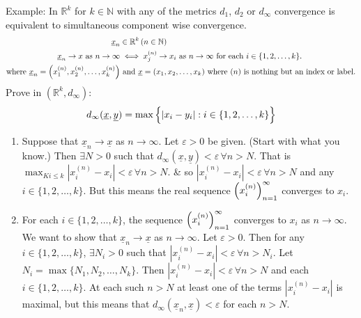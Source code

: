 \documentclass[10pt]{article}
\begin{document}
Example: In $\mathbb{R}^{k}$ for $k\in\mathbb{N}$ with any of the metrics $d_{1}$, $d_{2}$ or $d_{\infty}$ convergence is equivalent to simultaneous component wise convergence.
\begin{align*}
    \underline{x}_{n}&\in\mathbb{R}^{k}\,(n\in\mathbb{N})\\
    \underline{x}_{n}\to x\text{ as }n\to\infty&\iff x_{j}^{(n)}\to x_{i}\text{ as }n\to\infty\text{ for each }i\in\{1,2,\dots,k\}.\\
    \text{where }\underline{x}_{n}=\Big{(}x_{1}^{(n)}, x_{2}^{(n)}, \dots, x_{k}^{(n)}\Big{)}&\text{ and }\underline{x}=(x_{1}, x_{2}, \dots, x_{k})\text{ where }(n)\text{ is nothing but an index or label.}
\end{align*}
Prove in $(\mathbb{R}^{k}, d_{\infty})$:
\begin{align*}
    d_{\infty}(\underline{x}, \underline{y})=\max\Big{\{}|x_{i}-y_{i}|:i\in\{1, 2, \dots, k\}\Big{\}}
\end{align*}
\begin{enumerate}[label=\roman*)]
    \item Suppose that $\underline{x}_{n}\to\underline{x}$ as $n\to\infty$. Let $\varepsilon>0$ be given. (Start with what you know.) Then $\exists N>0$ such that $d_{\infty}(\underline{x}, \underline{y})<\varepsilon\,\forall n>N$. That is $\max_{Ki\leq k}|x_{i}^{(n)}-x_{i}|<\varepsilon\,\forall n>N$. \& so $|x_{i}^{(n)}-x_{i}|<\varepsilon\,\forall n>N$ and any $i\in\{1, 2, \dots, k\}$. But this means the real sequence $\Big{(}x_{i}^{(n)}\Big{)}_{n=1}^{\infty}$ converges to $x_{i}$.
    
    \item For each $i\in\{1, 2, \dots, k\}$, the sequence $\Big{(}x_{i}^{(n)}\Big{)}_{n=1}^{\infty}$ converges to $x_{i}$ as $n\to\infty$. We want to show that $\underline{x}_{n}\to\underline{x}$ as $n\to\infty$. Let $\varepsilon>0$. Then for any $i\in\{1, 2, \dots, k\}$, $\exists N_{i}>0$ such that $|x_{i}^{(n)}-x_{i}|<\varepsilon\,\forall n>N_{i}$. Let $N_{i}=\max\{N_{1}, N_{2}, \dots, N_{k}\}$. Then $|x_{i}^{(n)}-x_{i}|<\varepsilon\,\forall n>N$ and each $i\in\{1, 2, \dots, k\}$. At each such $n>N$ at least one of the terms $|x_{i}^{(n)}-x_{i}|$ is maximal, but this means that $d_{\infty}(\underline{x}_{n}, \underline{x})<\varepsilon$ for each $n>N$.
\end{enumerate}
\end{document}
